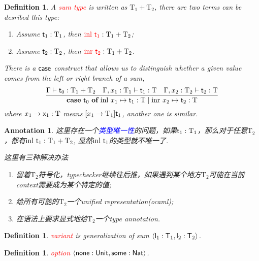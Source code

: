 \documentclass{article}
\theoremstyle{plain}
\newtheorem{definition}[theorem]{Definition}
\newtheorem{annotation}[theorem]{Annotation}
\theoremstyle{nonumberplain}
\newcommand{\inl}[1]{\ensuremath{\text{inl}~#1}}
\newcommand{\inr}[1]{\ensuremath{\text{inr}~#1}}
\newcommand{\caseof}[3]{\ensuremath{{\textbf{case}}~#1~{\textbf{of}}~\inl{x_1}\mapsto #2\mid\inr{x_2}\mapsto #3}}
\newcommand{\singletype}[1]{\text{#1}}
\newcommand{\termtype}[2]{\ensuremath{#1:#2}}
\newcommand{\term}[1]{\ensuremath\mathsf{#1}}
\newcommand{\redt}[1]{\textcolor{red}{#1}}
\newcommand{\bluet}[1]{\textcolor{blue}{#1}}
\begin{document}
\begin{definition}
\rm A \redt{sum type} is written as $\singletype{T}_1 + \singletype{T}_2$, there are two terms can be desribed this type: 
\begin{enumerate}
	\item Assume $\termtype{\term{t}_1}{\singletype{T}_1}$, then $\termtype{\redt{\inl{\term{t}_1}}}{\singletype{T}_1 + \singletype{T}_2}$;
	\item Assume $\termtype{\term{t}_2}{\singletype{T}_2}$, then $\termtype{\redt{\inr{\term{t}_2}}}{\singletype{T}_1 + \singletype{T}_2}$.
\end{enumerate}
There is a $\term{case}$ construct that allows us to distinguish whether a given value comes from the left or right branch of a sum,
$$
\infer{\caseof{\term{t}_0}{\term{t}_1:\singletype{T}}{\term{t}_2:\singletype{T}}}{\Gamma \vdash \term{t}_0:\singletype{T}_1 + \singletype{T}_2 & \Gamma,x_1:\singletype{T}_1 \vdash \term{t}_1:\singletype{T} & \Gamma,x_2:\singletype{T}_2 \vdash \term{t}_2:\singletype{T}}
$$
where $x_1 \to \term{x}_1:\singletype{T}$ means $[x_1 \to \singletype{T}_1]\term{t}_1$, another one is similar. 
\end{definition}


\begin{annotation}
\rm 这里存在一个\bluet{类型唯一性}的问题，如果$\termtype{\term{t}_1}{\singletype{T}_1}$，那么对于任意$\singletype{T}_2$，都有$\termtype{\inl{\term{t}_1}}{\singletype{T}_1 + \singletype{T}_2}$, 显然$\inl{\term{t}_1}$的类型就不唯一了. 

这里有三种解决办法
\begin{enumerate}
	\item 留着$\singletype{T}_2$符号化，typechecker继续往后推，如果遇到某个地方$\singletype{T}_2$可能在当前context需要成为某个特定的值;
	\item 给所有可能的$\singletype{T}_2$一个unified representation(ocaml);
	\item 在语法上要求显式地给$\singletype{T}_2$一个type annotation. 
\end{enumerate}
\end{annotation}

\begin{definition}
\rm \redt{variant} is generalization of sum $\left<\term{l}_1:\term{T}_1, \term{l}_2:\term{T}_2\right>$. 
\end{definition}

\begin{definition}
\rm \redt{option} $\left<\term{none}:\term{Unit}, \term{some}:\term{Nat} \right>$. 
\end{definition}
\end{document}
